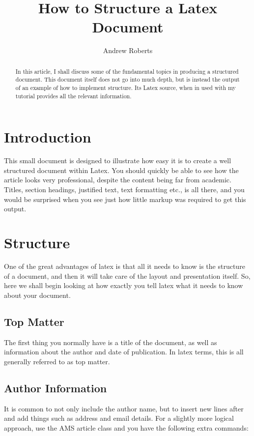 

	\title{How to Structure a Latex Document} 
	\author{Andrew Roberts}  

	\begin{abstract}
		In this article, I shall discuss some of the fundamental topics in
		producing a structured document.  This document itself does not go into
		much depth, but is instead the output of an example of how to implement
		structure. Its Latex source, when in used with my tutorial
		provides all the relevant information.  \end{abstract}
	
	\section{Introduction}
	This small document is designed to illustrate how easy it is to create a
	well structured document within Latex.  You should quickly be able to
	see how the article looks very professional, despite the content being
	far from academic.  Titles, section headings, justified text, text
	formatting etc., is all there, and you would be surprised when you see
	just how little markup was required to get this output.
	
	\section{Structure}
	One of the great advantages of latex is that all it needs to know is
	the structure of a document, and then it will take care of the layout
	and presentation itself.  So, here we shall begin looking at how exactly
	you tell latex what it needs to know about your document.


	\subsection{Top Matter}
	The first thing you normally have is a title of the document, as well as
	information about the author and date of publication. In latex terms,
	this is all generally referred to as top matter.
	
	\subsection{Author Information}

	It is common to not only include the author name, but to insert new
	lines after and add things such
	as address and email details.  For a slightly more logical approach, use
	the AMS article class and you have the following extra
	commands:
	
